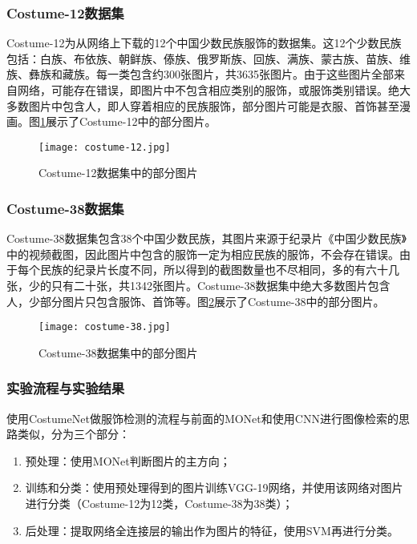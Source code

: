 \subsubsection{Costume-12数据集}
Costume-12为从网络上下载的12个中国少数民族服饰的数据集。这12个少数民族包括：白族、布依族、朝鲜族、傣族、俄罗斯族、回族、满族、蒙古族、苗族、维族、彝族和藏族。每一类包含约300张图片，共3635张图片。由于这些图片全部来自网络，可能存在错误，即图片中不包含相应类别的服饰，或服饰类别错误。绝大多数图片中包含人，即人穿着相应的民族服饰，部分图片可能是衣服、首饰甚至漫画。图\ref{fig:costume-12}展示了Costume-12中的部分图片。

\begin{figure}
	\centering
	\texttt{[image: costume-12.jpg]}
	\caption{Costume-12数据集中的部分图片}\label{fig:costume-12}
\end{figure}

\subsubsection{Costume-38数据集}
Costume-38数据集包含38个中国少数民族，其图片来源于纪录片《中国少数民族》中的视频截图，因此图片中包含的服饰一定为相应民族的服饰，不会存在错误。由于每个民族的纪录片长度不同，所以得到的截图数量也不尽相同，多的有六十几张，少的只有二十张，共1342张图片。Costume-38数据集中绝大多数图片包含人，少部分图片只包含服饰、首饰等。图\ref{fig:costume-38}展示了Costume-38中的部分图片。

\begin{figure}
	\centering
	\texttt{[image: costume-38.jpg]}
	\caption{Costume-38数据集中的部分图片}\label{fig:costume-38}
\end{figure}

\subsubsection{实验流程与实验结果}

使用CostumeNet做服饰检测的流程与前面的MONet和使用CNN进行图像检索的思路类似，分为三个部分：
\begin{enumerate}
	\item 预处理：使用MONet判断图片的主方向；
	\item 训练和分类：使用预处理得到的图片训练VGG-19网络，并使用该网络对图片进行分类（Costume-12为12类，Costume-38为38类）；
	\item 后处理：提取网络全连接层的输出作为图片的特征，使用SVM再进行分类。
\end{enumerate}

